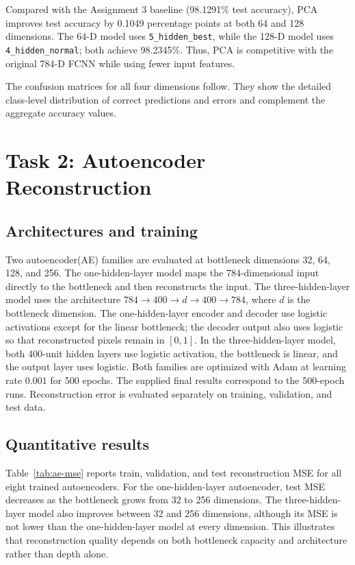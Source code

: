 \documentclass[conference,onecolumn]{IEEEtran}
\begin{document}
Compared with the Assignment 3 baseline (98.1291\% test accuracy), PCA improves
test accuracy by 0.1049 percentage points at both 64 and 128 dimensions. The 64-D model
uses \texttt{5\_hidden\_best}, while the 128-D model uses \texttt{4\_hidden\_normal};
both achieve 98.2345\%. Thus, PCA is competitive with the original 784-D FCNN while
using fewer input features.

The confusion matrices for all four dimensions follow. They show the detailed class-level distribution of correct predictions and errors and complement the aggregate accuracy values.


\FloatBarrier

\section{Task 2: Autoencoder Reconstruction}
\subsection{Architectures and training}
Two autoencoder(AE) families are evaluated at bottleneck dimensions 32, 64, 128, and 256. The one-hidden-layer model maps the 784-dimensional input directly to the bottleneck and then reconstructs the input. The three-hidden-layer model uses the architecture $784\rightarrow400\rightarrow d\rightarrow400\rightarrow784$, where $d$ is the bottleneck dimension. The one-hidden-layer encoder and decoder use logistic activations except for the linear
bottleneck; the decoder output also uses logistic so that reconstructed pixels remain in
$[0,1]$. In the three-hidden-layer model, both 400-unit hidden layers use logistic activation,
the bottleneck is linear, and the output layer uses logistic. Both families are optimized
with Adam at learning rate $0.001$ for 500 epochs. The supplied final results correspond to the 500-epoch runs. Reconstruction error is evaluated separately on training, validation, and test data.

\subsection{Quantitative results}
Table~\ref{tab:ae-mse} reports train, validation, and test reconstruction MSE for all eight trained autoencoders. For the one-hidden-layer autoencoder, test MSE decreases as the bottleneck grows from 32 to 256 dimensions. The three-hidden-layer model also improves between 32 and 256 dimensions, although its MSE is not lower than the one-hidden-layer model at every dimension. This illustrates that reconstruction quality depends on both bottleneck capacity and architecture rather than depth alone.
\end{document}

